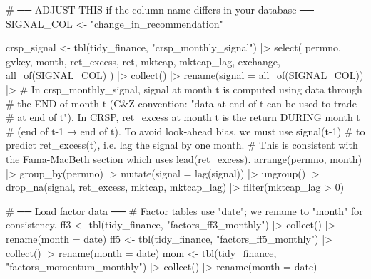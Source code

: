 \documentclass[
  letterpaper,
  DIV=11,
  numbers=noendperiod]{scrartcl}
\newenvironment{Shaded}{\begin{snugshade}}{\end{snugshade}}
\newcommand{\AttributeTok}[1]{\textcolor[rgb]{0.40,0.45,0.13}{#1}}
\newcommand{\CommentTok}[1]{\textcolor[rgb]{0.37,0.37,0.37}{#1}}
\newcommand{\DecValTok}[1]{\textcolor[rgb]{0.68,0.00,0.00}{#1}}
\newcommand{\FunctionTok}[1]{\textcolor[rgb]{0.28,0.35,0.67}{#1}}
\newcommand{\NormalTok}[1]{\textcolor[rgb]{0.00,0.23,0.31}{#1}}
\newcommand{\OtherTok}[1]{\textcolor[rgb]{0.00,0.23,0.31}{#1}}
\newcommand{\RegionMarkerTok}[1]{\textcolor[rgb]{0.00,0.23,0.31}{#1}}
\newcommand{\SpecialCharTok}[1]{\textcolor[rgb]{0.37,0.37,0.37}{#1}}
\newcommand{\StringTok}[1]{\textcolor[rgb]{0.13,0.47,0.30}{#1}}
\begin{document}
\begin{Shaded}
\begin{Highlighting}[]
\CommentTok{\# ── ADJUST THIS if the column name differs in your database ──}
\NormalTok{SIGNAL\_COL }\OtherTok{\textless{}{-}} \StringTok{"change\_in\_recommendation"}

\NormalTok{crsp\_signal }\OtherTok{\textless{}{-}} \FunctionTok{tbl}\NormalTok{(tidy\_finance, }\StringTok{"crsp\_monthly\_signal"}\NormalTok{) }\SpecialCharTok{|\textgreater{}}
  \FunctionTok{select}\NormalTok{(}
\NormalTok{    permno, gvkey, month, ret\_excess, ret, mktcap, mktcap\_lag,}
\NormalTok{    exchange, }\FunctionTok{all\_of}\NormalTok{(SIGNAL\_COL)}
\NormalTok{  ) }\SpecialCharTok{|\textgreater{}}
  \FunctionTok{collect}\NormalTok{() }\SpecialCharTok{|\textgreater{}}
  \FunctionTok{rename}\NormalTok{(}\AttributeTok{signal =} \FunctionTok{all\_of}\NormalTok{(SIGNAL\_COL)) }\SpecialCharTok{|\textgreater{}}
  \CommentTok{\# In crsp\_monthly\_signal, signal at month t is computed using data through}
  \CommentTok{\# the }\RegionMarkerTok{END}\CommentTok{ of month t (C\&Z convention: "data at end of t can be used to trade}
  \CommentTok{\# at end of t"). In CRSP, ret\_excess at month t is the return DURING month t}
  \CommentTok{\# (end of t{-}1 → end of t). To avoid look{-}ahead bias, we must use signal(t{-}1)}
  \CommentTok{\# to predict ret\_excess(t), i.e. lag the signal by one month.}
  \CommentTok{\# This is consistent with the Fama{-}MacBeth section which uses lead(ret\_excess).}
  \FunctionTok{arrange}\NormalTok{(permno, month) }\SpecialCharTok{|\textgreater{}}
  \FunctionTok{group\_by}\NormalTok{(permno) }\SpecialCharTok{|\textgreater{}}
  \FunctionTok{mutate}\NormalTok{(}\AttributeTok{signal =} \FunctionTok{lag}\NormalTok{(signal)) }\SpecialCharTok{|\textgreater{}}
  \FunctionTok{ungroup}\NormalTok{() }\SpecialCharTok{|\textgreater{}}
  \FunctionTok{drop\_na}\NormalTok{(signal, ret\_excess, mktcap, mktcap\_lag) }\SpecialCharTok{|\textgreater{}}
  \FunctionTok{filter}\NormalTok{(mktcap\_lag }\SpecialCharTok{\textgreater{}} \DecValTok{0}\NormalTok{)}

\CommentTok{\# ── Load factor data ──}
\CommentTok{\# Factor tables use "date"; we rename to "month" for consistency.}
\NormalTok{ff3 }\OtherTok{\textless{}{-}} \FunctionTok{tbl}\NormalTok{(tidy\_finance, }\StringTok{"factors\_ff3\_monthly"}\NormalTok{) }\SpecialCharTok{|\textgreater{}} \FunctionTok{collect}\NormalTok{() }\SpecialCharTok{|\textgreater{}} \FunctionTok{rename}\NormalTok{(}\AttributeTok{month =}\NormalTok{ date)}
\NormalTok{ff5 }\OtherTok{\textless{}{-}} \FunctionTok{tbl}\NormalTok{(tidy\_finance, }\StringTok{"factors\_ff5\_monthly"}\NormalTok{) }\SpecialCharTok{|\textgreater{}} \FunctionTok{collect}\NormalTok{() }\SpecialCharTok{|\textgreater{}} \FunctionTok{rename}\NormalTok{(}\AttributeTok{month =}\NormalTok{ date)}
\NormalTok{mom }\OtherTok{\textless{}{-}} \FunctionTok{tbl}\NormalTok{(tidy\_finance, }\StringTok{"factors\_momentum\_monthly"}\NormalTok{) }\SpecialCharTok{|\textgreater{}} \FunctionTok{collect}\NormalTok{() }\SpecialCharTok{|\textgreater{}} \FunctionTok{rename}\NormalTok{(}\AttributeTok{month =}\NormalTok{ date)}


\end{Highlighting}
\end{Shaded}
\end{document}
